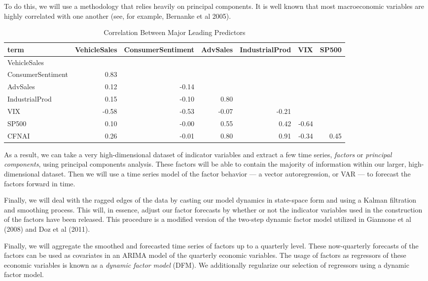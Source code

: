 \documentclass[11pt, letterpaper]{article}\usepackage[]{graphicx}\usepackage[]{color}
\begin{document}
To do this, we will use a methodology that relies heavily on principal components. It is well known that most macroeconomic variables are highly correlated with one another (see, for example, Bernanke et al 2005).
\begin{table}[H]
\centering
\begingroup\scriptsize
\begin{tabular}{lrrrrrr}
  \hline
term & VehicleSales & ConsumerSentiment & AdvSales & IndustrialProd & VIX & SP500 \\ 
  \hline
VehicleSales &  &  &  &  &  &  \\ 
  ConsumerSentiment & 0.83 &  &  &  &  &  \\ 
  AdvSales & 0.12 & -0.14 &  &  &  &  \\ 
  IndustrialProd & 0.15 & -0.10 & 0.80 &  &  &  \\ 
  VIX & -0.58 & -0.53 & -0.07 & -0.21 &  &  \\ 
  SP500 & 0.10 & -0.00 & 0.55 & 0.42 & -0.64 &  \\ 
  CFNAI & 0.26 & -0.01 & 0.80 & 0.91 & -0.34 & 0.45 \\ 
   \hline
\end{tabular}
\endgroup
\caption{Correlation Between Major Leading Predictors} 
\end{table}

As a result, we can take a very high-dimensional dataset of indicator variables and extract a few time series, \textit{factors} or \textit{principal components}, using principal components analysis. These factors will be able to contain the majority of information within our larger, high-dimensional dataset. Then we will use a time series model of the factor behavior --- a vector autoregression, or VAR --- to forecast the factors forward in time. 

Finally, we will deal with the ragged edges of the data by casting our model dynamics in state-space form and using a Kalman filtration and smoothing process. This will, in essence, adjust our factor forecasts by whether or not the indicator variables used in the construction of the factors have been released. This procedure is a modified version of the two-step dynamic factor model utilized in Giannone et al (2008) and Doz et al (2011).

Finally, we will aggregate the smoothed and forecasted time series of factors up to a quarterly level. These now-quarterly forecasts of the factors can be used as covariates in an ARIMA model of the quarterly economic variables. The usage of factors as regressors of these economic variables is known as a \textit{dynamic factor model} (DFM). We additionally regularize our selection of regressors using a dynamic factor model.
\end{document}
